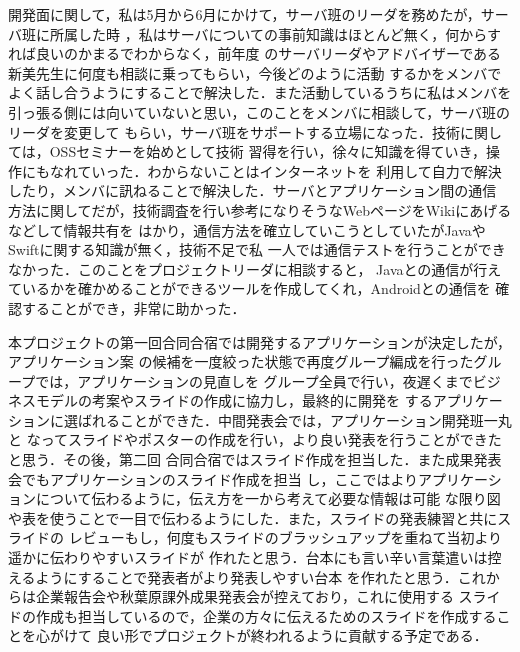 \par
開発面に関して，私は5月から6月にかけて，サーバ班のリーダを務めたが，サーバ班に所属した時
，私はサーバについての事前知識はほとんど無く，何からすれば良いのかまるでわからなく，前年度
のサーバリーダやアドバイザーである新美先生に何度も相談に乗ってもらい，今後どのように活動
するかをメンバでよく話し合うようにすることで解決した．また活動しているうちに私はメンバを
引っ張る側には向いていないと思い，このことをメンバに相談して，サーバ班のリーダを変更して
もらい，サーバ班をサポートする立場になった．技術に関しては，OSSセミナーを始めとして技術
習得を行い，徐々に知識を得ていき，操作にもなれていった．わからないことはインターネットを
利用して自力で解決したり，メンバに訊ねることで解決した．サーバとアプリケーション間の通信
方法に関してだが，技術調査を行い参考になりそうなWebページをWikiにあげるなどして情報共有を
はかり，通信方法を確立していこうとしていたがJavaやSwiftに関する知識が無く，技術不足で私
一人では通信テストを行うことができなかった．このことをプロジェクトリーダに相談すると，
Javaとの通信が行えているかを確かめることができるツールを作成してくれ，Androidとの通信を
確認することができ，非常に助かった．
\par
本プロジェクトの第一回合同合宿では開発するアプリケーションが決定したが，アプリケーション案
の候補を一度絞った状態で再度グループ編成を行ったグループでは，アプリケーションの見直しを
グループ全員で行い，夜遅くまでビジネスモデルの考案やスライドの作成に協力し，最終的に開発を
するアプリケーションに選ばれることができた．中間発表会では，アプリケーション開発班一丸と
なってスライドやポスターの作成を行い，より良い発表を行うことができたと思う．その後，第二回
合同合宿ではスライド作成を担当した．また成果発表会でもアプリケーションのスライド作成を担当
し，ここではよりアプリケーションについて伝わるように，伝え方を一から考えて必要な情報は可能
な限り図や表を使うことで一目で伝わるようにした．また，スライドの発表練習と共にスライドの
レビューもし，何度もスライドのブラッシュアップを重ねて当初より遥かに伝わりやすいスライドが
作れたと思う．台本にも言い辛い言葉遣いは控えるようにすることで発表者がより発表しやすい台本
を作れたと思う．これからは企業報告会や秋葉原課外成果発表会が控えており，これに使用する
スライドの作成も担当しているので，企業の方々に伝えるためのスライドを作成することを心がけて
良い形でプロジェクトが終われるように貢献する予定である．

